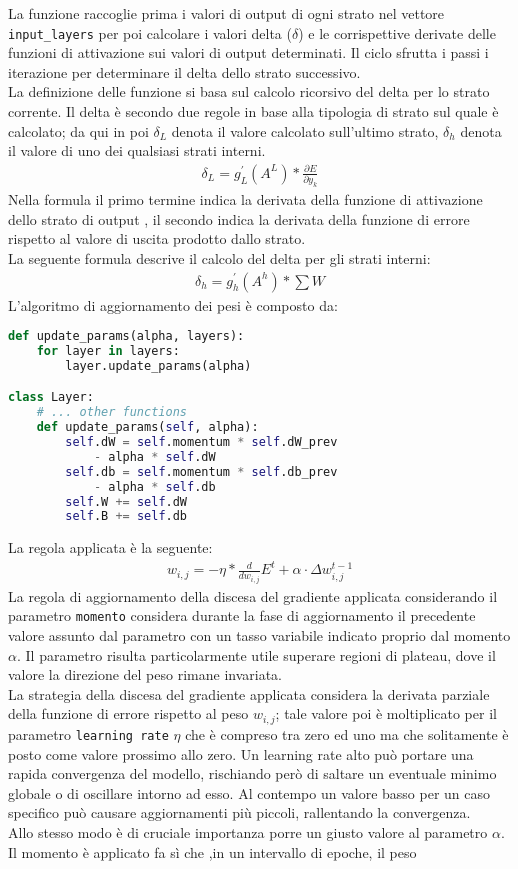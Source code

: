 La funzione raccoglie prima i valori di output di ogni strato nel vettore \texttt{input\_layers} per poi calcolare i valori delta ($\delta$) e le corrispettive derivate delle funzioni di attivazione sui valori di output determinati. Il ciclo sfrutta i passi i iterazione per determinare il delta dello strato successivo. \\
La definizione delle funzione si basa sul calcolo ricorsivo del delta per lo strato corrente.
Il delta è secondo due regole in base alla tipologia di strato sul quale è calcolato; da qui in poi $\delta_L$ denota il valore calcolato sull'ultimo strato, $\delta_h$ denota il valore di uno dei qualsiasi strati interni.
\begin{align*}
\delta_L = g^{\prime}_L(A^L) * \frac{\partial E}{\partial y_k}
\end{align*}
Nella formula il primo termine indica la derivata della funzione di attivazione dello strato di output , il secondo indica la derivata della funzione di errore rispetto al valore di uscita prodotto dallo strato. \\
La seguente formula descrive il calcolo del delta per gli strati interni:
\begin{align*}
\delta_h = g^{\prime}_h(A^h) * \sum{W}
\end{align*}
L'algoritmo di aggiornamento dei pesi è composto da:
\begin{lstlisting}[language=Python]
def update_params(alpha, layers):
    for layer in layers:
        layer.update_params(alpha)

class Layer:
    # ... other functions
    def update_params(self, alpha):
        self.dW = self.momentum * self.dW_prev
            - alpha * self.dW
        self.db = self.momentum * self.db_prev 
            - alpha * self.db
        self.W += self.dW
        self.B += self.db
\end{lstlisting}
La regola applicata è la seguente:
\begin{align*}
w_{i,j} = - \eta * \frac{d}{dw_{i,j}}E^t + \alpha \cdot \Delta w_{i,j}^{t-1}
\end{align*}
La regola di aggiornamento della discesa del gradiente applicata considerando il parametro \texttt{momento} considera durante la fase di aggiornamento il precedente valore assunto dal parametro con un tasso variabile indicato proprio dal momento $\alpha$. Il parametro risulta particolarmente utile superare regioni di plateau, dove il valore la direzione del peso rimane invariata.  \\
La strategia della discesa del gradiente applicata considera la derivata parziale della funzione di errore rispetto al peso $w_{i,j}$; tale valore poi è moltiplicato per il parametro \texttt{learning rate} $\eta$ che è compreso tra zero ed uno ma che solitamente è posto come valore prossimo allo zero. Un learning rate alto può portare una rapida convergenza del modello, rischiando però di saltare un eventuale minimo globale o di oscillare intorno ad esso. Al contempo un valore basso per un caso specifico può causare aggiornamenti più piccoli, rallentando la convergenza. \\
Allo stesso modo è di cruciale importanza porre un giusto valore al parametro $\alpha$. Il momento è applicato fa sì che ,in un intervallo di epoche, il peso 

